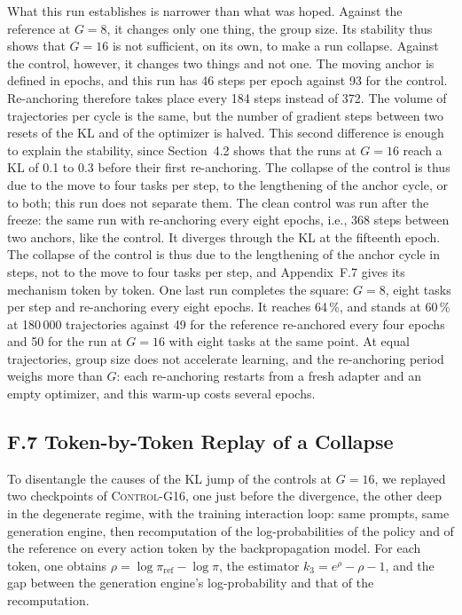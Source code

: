 \documentclass[11pt,a4paper]{article}
\begin{document}
What this run establishes is narrower than what was hoped. Against the reference at $G=8$, it changes only one thing, the group size. Its stability thus shows that $G=16$ is not sufficient, on its own, to make a run collapse. Against the control, however, it changes two things and not one. The moving anchor is defined in epochs, and this run has 46 steps per epoch against 93 for the control. Re-anchoring therefore takes place every 184 steps instead of 372. The volume of trajectories per cycle is the same, but the number of gradient steps between two resets of the KL and of the optimizer is halved. This second difference is enough to explain the stability, since Section~4.2 shows that the runs at $G=16$ reach a KL of 0.1 to 0.3 before their first re-anchoring. The collapse of the control is thus due to the move to four tasks per step, to the lengthening of the anchor cycle, or to both; this run does not separate them. The clean control was run after the freeze: the same run with re-anchoring every eight epochs, i.e., 368 steps between two anchors, like the control. It diverges through the KL at the fifteenth epoch. The collapse of the control is thus due to the lengthening of the anchor cycle in steps, not to the move to four tasks per step, and Appendix~F.7 gives its mechanism token by token. One last run completes the square: $G=8$, eight tasks per step and re-anchoring every eight epochs. It reaches 64\,\%, and stands at 60\,\% at 180\,000 trajectories against 49 for the reference re-anchored every four epochs and 50 for the run at $G=16$ with eight tasks at the same point. At equal trajectories, group size does not accelerate learning, and the re-anchoring period weighs more than $G$: each re-anchoring restarts from a fresh adapter and an empty optimizer, and this warm-up costs several epochs.



\subsection*{F.7 Token-by-Token Replay of a Collapse}

To disentangle the causes of the KL jump of the controls at $G=16$, we replayed two checkpoints of \textsc{Control-G16}, one just before the divergence, the other deep in the degenerate regime, with the training interaction loop: same prompts, same generation engine, then recomputation of the log-probabilities of the policy and of the reference on every action token by the backpropagation model. For each token, one obtains $\rho = \log \pi_{\mathrm{ref}} - \log \pi$, the estimator $k_3 = e^{\rho} - \rho - 1$, and the gap between the generation engine's log-probability and that of the recomputation.
\end{document}
